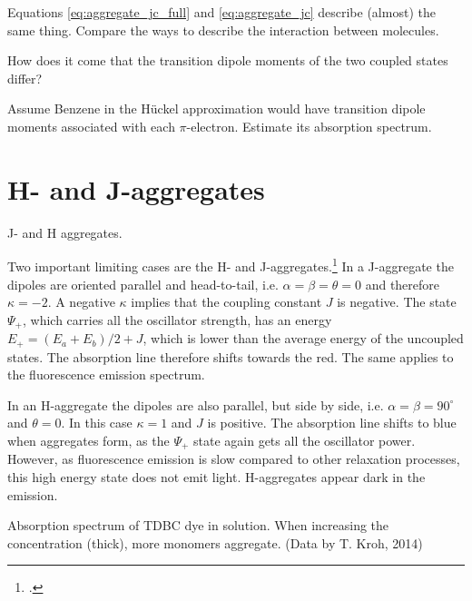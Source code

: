 \begin{questions}
   \item Equations  \ref{eq:aggregate_jc_full} and \ref{eq:aggregate_jc} describe  (almost) the same thing. Compare the ways to describe the interaction between molecules.
   \item How does it come that the transition dipole moments of the two coupled states differ?
   \item Assume Benzene in the Hückel approximation would have transition dipole moments associated with each $\pi$-electron. Estimate its absorption spectrum.
\end{questions}


\section{H- and J-aggregates}

\begin{marginfigure}

\caption{J- and H aggregates.}
\end{marginfigure}

Two important limiting cases are the H- and J-aggregates.\footcite[chapters 2.1.4.3, 2.2.5.3]{KoehlerBaessler2015} In a J-aggregate the dipoles are oriented parallel and head-to-tail, i.e. $\alpha = \beta = \theta = 0$ and therefore $\kappa = -2$. A negative $\kappa$ implies that the coupling constant $J$ is negative. The state $\Psi_+$, which carries all the oscillator strength, has an energy $E_+ = (E_a + E_b) / 2 + J$, which is lower than the average energy of the uncoupled states. The absorption line therefore shifts towards the red. The same applies to the fluorescence emission spectrum.

In an H-aggregate the dipoles are also parallel, but side by side, i.e. $\alpha = \beta = 90^\circ$ and $\theta = 0$. In this case $\kappa =1$ and $J$ is positive. The absorption line shifts to blue when aggregates form, as the $\Psi_+$ state again gets all the oscillator power. However, as fluorescence emission is slow compared to other relaxation processes, this high energy state does not emit light. H-aggregates appear dark in the emission.

\begin{marginfigure}

\caption{Absorption spectrum of TDBC dye in solution. When increasing the concentration (thick), more monomers aggregate. (Data by T. Kroh, 2014) }
\end{marginfigure}



